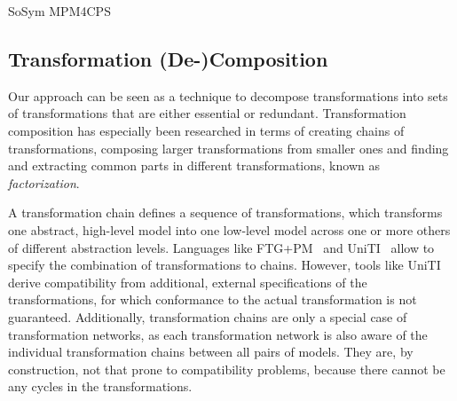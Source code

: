 \begin{copiedFrom}{SoSym MPM4CPS}
\subsection{Transformation (De-)Composition}
Our approach can be seen as a technique to decompose transformations into sets of transformations that are either essential or redundant.
Transformation composition has especially been researched in terms of creating chains of transformations, composing larger transformations from smaller ones and finding and extracting common parts in different transformations, known as \emph{factorization}.

A transformation chain defines a sequence of transformations, which transforms one abstract, high-level model into one low-level model across one or more others of different abstraction levels.
Languages like FTG+PM~\cite{lucio2013a} and UniTI~\cite{%
vanhooff2007UniTI-MODELS}
allow to specify the combination of transformations to chains.
However, tools like UniTI derive compatibility from additional, external specifications of the transformations, for which conformance to the actual transformation is not guaranteed.
Additionally, transformation chains are only a special case of transformation networks, as each transformation network is also aware of the individual transformation chains between all pairs of models.
They are, by construction, not that prone to compatibility problems, because there cannot be any cycles in the transformations.


\end{copiedFrom}
